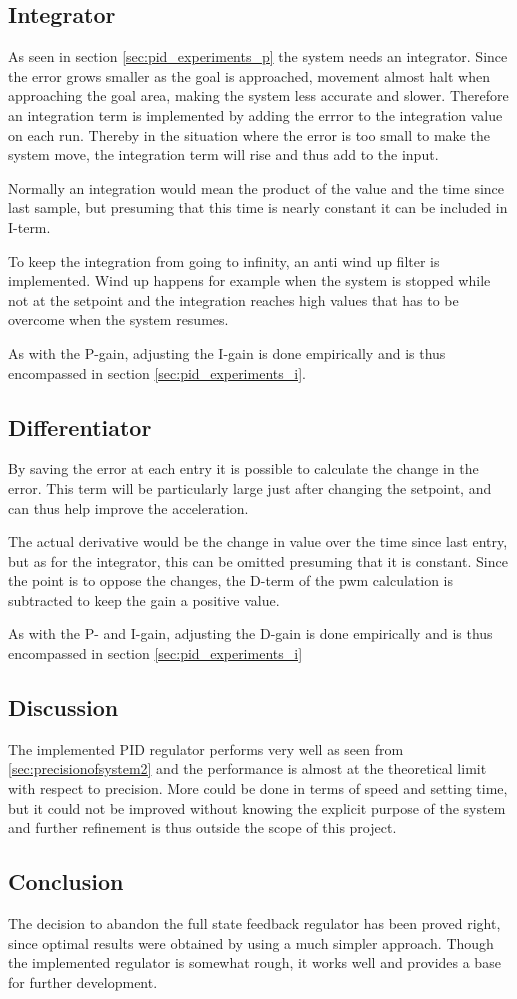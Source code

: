 \subsection{Integrator}\label{sec:integrator}
As seen in section \ref{sec:pid_experiments_p} the system needs an integrator. Since the error grows smaller as the goal is approached, movement almost halt when approaching the goal area, making the system less accurate and slower. Therefore an integration term is implemented by adding the errror to the integration value on each run. Thereby in the situation where the error is too small to make the system move, the integration term will rise and thus add to the input. 

Normally an integration would mean the product of the value and the time since last sample, but presuming that this time is nearly constant it can be included in I-term. 

To keep the integration from going to infinity, an anti wind up filter is implemented. Wind up happens for example when the system is stopped while not at the setpoint and the integration reaches high values that has to be overcome when the system resumes.

As with the P-gain, adjusting the I-gain is done empirically and is thus encompassed in section \ref{sec:pid_experiments_i}.

\subsection{Differentiator}
By saving the error at each entry it is possible to calculate the change in the error. This term will be particularly large just after changing the setpoint, and can thus help improve the acceleration. 

The actual derivative would be the change in value over the time since last entry, but as for the integrator, this can be omitted presuming that it is constant. Since the point is to oppose the changes, the D-term of the pwm calculation is subtracted to keep the gain a positive value.

As with the P- and I-gain, adjusting the D-gain is done empirically and is thus encompassed in section \ref{sec:pid_experiments_i}


\subsection{Discussion}
The implemented PID regulator performs very well as seen from \ref{sec:precisionofsystem2} and the performance is almost at the theoretical limit with respect to precision. More could be done in terms of speed and setting time, but it could not be improved without knowing the explicit purpose of the system and further refinement is thus outside the scope of this project.

\subsection{Conclusion}
The decision to abandon the full state feedback regulator has been proved right, since optimal results were obtained by using a much simpler approach. Though the implemented regulator is somewhat rough, it works well and provides a base for further development.











